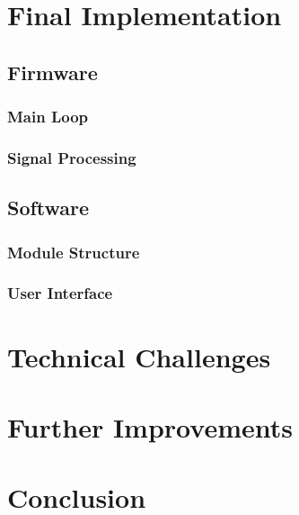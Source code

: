 \documentclass[a4paper,11pt]{article}
\begin{document}
\section{Final Implementation}
\label{sec:final_implementation}
\subsection{Firmware}
\label{sec:firmware}
\subsubsection{Main Loop}
\label{subsec:main_loop}
\subsubsection{Signal Processing}
\label{subsec:firmware_processing}
\subsection{Software}
\label{sec:software}
\subsubsection{Module Structure}
\label{subsec:software_modules}
\subsubsection{User Interface}
\label{subsec:software_ui}

\section{Technical Challenges}
\label{sec:technical_problems}

\section{Further Improvements}
\label{sec:further_improvements}

\section{Conclusion}
\label{sec:conclusion}
\end{document}
